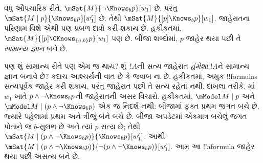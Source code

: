 \documentclass[../../../include/open-logic-section]{subfiles}
\begin{document}
વધુ ઔપચારિક રીતે, $\mSat{M}{\lnot \Knows_b p}[w_1]$ છે,
પરંતુ $\mSat{M \mid p}{\Knows_b p}[w'_1]$ છે. તેથી
$\mSat{M}{[p] \Knows_b p}[w_1]$. જાહેરાતના પરિણામ વિશે
એથી પણ પ્રબળ દાવો કરી શકાય છે. હકીકતમાં,
$\mSat{M}{[p]\CKnows_{\{a,b\}} p}[w_1]$ પણ છે. બીજા શબ્દોમાં,
$p$ જાહેર થયા પછી તે \emph{સામાન્ય જ્ઞાન} બને છે.

પણ શું સામાન્ય રીતે પણ એમ જ થાય? શું~$!A$ની સત્ય જાહેરાત
\emph{હંમેશા} $!A$ને સામાન્ય જ્ઞાન બનાવે છે? કદાચ આશ્ચર્યની વાત
છે કે જવાબ ના છે. હકીકતમાં, અમુક !!{formula}s સત્યપૂર્વક
જાહેર કરી શકાય, પરંતુ જાહેરાત પછી તે સત્ય રહેતાં નથી. દાખલા
તરીકે, માં~$w_1$ ખાતે
$p \land \lnot \Knows_b p$ની જાહેરાતની અસર વિચારો.
હકીકતમાં, $\mModel M \mid p$ અને
$\mModel M \mid (p \land \lnot \Knows_b p)$ એક જ નિદર્શ
નથી: બીજામાં ફક્ત પ્રથમ જગત બચે છે, જ્યારે પહેલામાં પ્રથમ
અને ત્રીજું બંને બચે છે. બીજા અપડેટમાં એકમાત્ર બચેલું
જગત પોતાને જ $b$-સુલભ છે અને ત્યાં $p$ સત્ય છે; તેથી
$\mSat{M \mid (p\land\lnot\Knows_b p)}{\Knows_b p}[w'_1]$.
આથી
$\mSat{M \mid (p \land \lnot \Knows_b p)}{\lnot
(p \land \lnot \Knows_b p)}[w'_1]$. આમ આ !!a{formula}
જાહેર થયા પછી અસત્ય બને છે.
\end{document}
